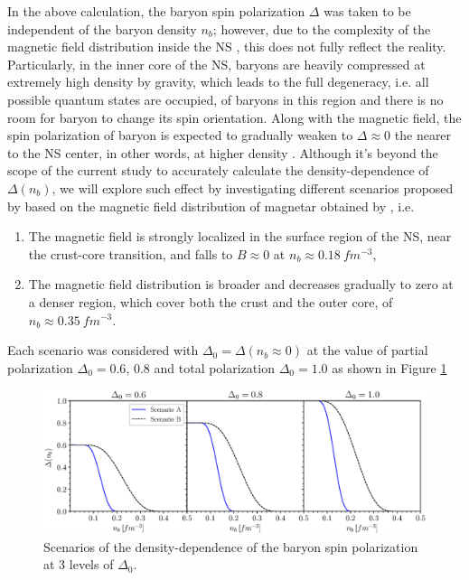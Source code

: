 In the above calculation, the baryon spin polarization $\Delta$ was taken to be independent of the baryon density $n_b$; however, due to the complexity of the magnetic field distribution inside the \gls{NS} \citep{fujisawa2014magnetic}, this does not fully reflect the reality. Particularly, in the inner core of the \gls{NS}, baryons are heavily compressed at extremely high density by gravity, which leads to the full degeneracy, i.e. all possible quantum states are occupied, of baryons in this region and there is no room for baryon to change its spin orientation. Along with the magnetic field, the spin polarization of baryon is expected to gradually weaken to $\Delta \approx 0$ the nearer to the \gls{NS} center, in other words, at higher density \citep{fujisawa2014magnetic,tan2020spin}. Although it's beyond the scope of the current study to accurately calculate the density-dependence of $\Delta(n_b)$, we will explore such effect by investigating different scenarios proposed by \cite{tan2020spin} based on the magnetic field distribution of magnetar obtained by \cite{fujisawa2014magnetic}, i.e.
\begin{enumerate}[label=(\Alph*)]
    \item The magnetic field is strongly localized in the surface region of the \gls{NS}, near the crust-core transition, and falls to $B\approx 0$ at $n_b \approx 0.18\: fm^{-3}$,
    \item The magnetic field distribution is broader and decreases gradually to zero at a denser region, which cover both the crust and the outer core, of $n_b \approx 0.35\:fm^{-3}$.
\end{enumerate}
Each scenario was considered with $\Delta_0 = \Delta(n_b \approx 0)$ at the value of partial polarization $\Delta_0 = 0.6$, $0.8$ and total polarization $\Delta_0 = 1.0$ as shown in Figure \ref{fig:Delta}
\begin{figure}[ht!]
    \centering
    \includegraphics[width=\textwidth]{fig/Delta.eps}
    \caption{Scenarios of the density-dependence of the baryon spin polarization at 3 levels of $\Delta_0$.}
    \label{fig:Delta}
\end{figure} 

